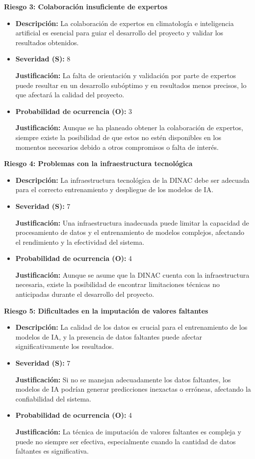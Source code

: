 \documentclass[
11pt, %
codirector, %
]{charter}
\begin{document}
\textbf{Riesgo 3: Colaboración insuficiente de expertos}

\begin{itemize}
  \item \textbf{Descripción:} La colaboración de expertos en climatología e inteligencia artificial es esencial para guiar el desarrollo del proyecto y validar los resultados obtenidos.
  \item \textbf{Severidad (S):} 8
  
  \textbf{Justificación:} La falta de orientación y validación por parte de expertos puede resultar en un desarrollo subóptimo y en resultados menos precisos, lo que afectará la calidad del proyecto.
  \item \textbf{Probabilidad de ocurrencia (O):} 3
  
  \textbf{Justificación:} Aunque se ha planeado obtener la colaboración de expertos, siempre existe la posibilidad de que estos no estén disponibles en los momentos necesarios debido a otros compromisos o falta de interés.
\end{itemize}

\textbf{Riesgo 4: Problemas con la infraestructura tecnológica}

\begin{itemize}
  \item \textbf{Descripción:} La infraestructura tecnológica de la DINAC debe ser adecuada para el correcto entrenamiento y despliegue de los modelos de IA.
  \item \textbf{Severidad (S):} 7
  
  \textbf{Justificación:} Una infraestructura inadecuada puede limitar la capacidad de procesamiento de datos y el entrenamiento de modelos complejos, afectando el rendimiento y la efectividad del sistema.
  \item \textbf{Probabilidad de ocurrencia (O):} 4
  
  \textbf{Justificación:} Aunque se asume que la DINAC cuenta con la infraestructura necesaria, existe la posibilidad de encontrar limitaciones técnicas no anticipadas durante el desarrollo del proyecto.
\end{itemize}

\textbf{Riesgo 5: Dificultades en la imputación de valores faltantes}

\begin{itemize}
  \item \textbf{Descripción:} La calidad de los datos es crucial para el entrenamiento de los modelos de IA, y la presencia de datos faltantes puede afectar significativamente los resultados.
  \item \textbf{Severidad (S):} 7
  
  \textbf{Justificación:} Si no se manejan adecuadamente los datos faltantes, los modelos de IA podrían generar predicciones inexactas o erróneas, afectando la confiabilidad del sistema.
  \item \textbf{Probabilidad de ocurrencia (O):} 4
  
  \textbf{Justificación:} La técnica de imputación de valores faltantes es compleja y puede no siempre ser efectiva, especialmente cuando la cantidad de datos faltantes es significativa.
\end{itemize}
\end{document}
